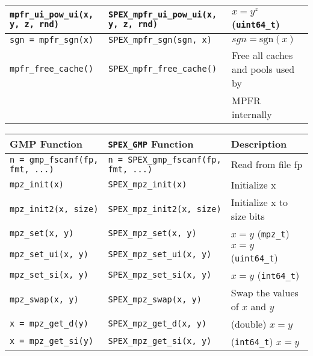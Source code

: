 \documentclass[12pt]{report}
\theoremstyle{definition}
\begin{document}
{\begin{center}
\begin{tabular}{|l|l|l|}
\verb|mpfr_ui_pow_ui(x, y, z, rnd)|
    & \verb|SPEX_mpfr_ui_pow_ui(x, y, z, rnd)|
    & $x = y^z$ (\verb|uint64_t|) \\ \hline
\verb|sgn = mpfr_sgn(x)|
    & \verb|SPEX_mpfr_sgn(sgn, x)|
    & $sgn =\text{sgn}(x)$ \\ \hline
\verb|mpfr_free_cache()|
    & \verb|SPEX_mpfr_free_cache()|
    & Free all caches and pools used by \\&&MPFR internally \\ \hline
\end{tabular}
\end{center}
\begin{center}
\begin{tabular}{|l|l|l|}
\hline
{\bf GMP Function} & \verb|SPEX_GMP| {\bf Function} & {\bf Description} \\
\hline\hline
\verb|n = gmp_fscanf(fp, fmt, ...)|
    & \verb|n = SPEX_gmp_fscanf(fp, fmt, ...)|
    & Read from file fp \\ \hline
\verb|mpz_init(x)|
    & \verb|SPEX_mpz_init(x)|
    & Initialize x \\ \hline
\verb|mpz_init2(x, size)|
    & \verb|SPEX_mpz_init2(x, size)|
    & Initialize x to size bits \\ \hline
\verb|mpz_set(x, y)|
    & \verb|SPEX_mpz_set(x, y)| 
    & $x = y$ (\verb|mpz_t|) \\ \hline
\verb|mpz_set_ui(x, y)|
    & \verb|SPEX_mpz_set_ui(x, y)|
    & $x = y$ (\verb|uint64_t|) \\ \hline
\verb|mpz_set_si(x, y)|
    & \verb|SPEX_mpz_set_si(x, y)|
    & $x = y$ (\verb|int64_t|) \\ \hline
\verb|mpz_swap(x, y)|
    & \verb|SPEX_mpz_swap(x, y)|
    & Swap the values of $x$ and $y$ \\ \hline
\verb|x = mpz_get_d(y)|
    & \verb|SPEX_mpz_get_d(x, y)|
    &  (double) $x = y$\\ \hline
\verb|x = mpz_get_si(y)|
    & \verb|SPEX_mpz_get_si(x, y)|
    & (\verb|int64_t|) $x = y$ \\ \hline

\end{tabular}
\end{center}}
\end{document}
